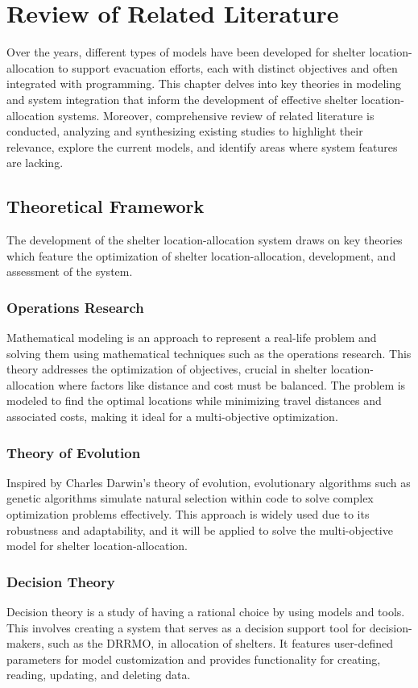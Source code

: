 \chapter{Review of Related Literature}

	Over the years, different types of models have been developed for shelter location-allocation to support evacuation efforts, each with distinct objectives and often integrated with programming. This chapter delves into key theories in modeling and system integration that inform the development of effective shelter location-allocation systems. Moreover, comprehensive review of related literature is conducted, analyzing and synthesizing existing studies to highlight their relevance, explore the current models, and identify areas where system features are lacking. 

\section{Theoretical Framework}
	The development of the shelter location-allocation system draws on key theories which feature the optimization of shelter location-allocation, development, and assessment of the system.

\subsection{Operations Research}
 	Mathematical modeling is an approach to represent a real-life problem and solving them using mathematical techniques such as the operations research. This theory addresses the optimization of objectives, crucial in shelter location-allocation where factors like distance and cost must be balanced. The problem is modeled to find the optimal locations while minimizing travel distances and associated costs, making it ideal for a multi-objective optimization.

\subsection{Theory of Evolution}
	Inspired by Charles Darwin’s theory of evolution, evolutionary algorithms such as genetic algorithms simulate natural selection within code to solve complex optimization problems effectively. This approach is widely used due to its robustness and adaptability, and it will be applied to solve the multi-objective model for shelter location-allocation.

\subsection{Decision Theory}
 	Decision theory is a study of having a rational choice by using models and tools. This involves creating a system that serves as a decision support tool for decision-makers, such as the DRRMO, in allocation of shelters. It features user-defined parameters for model customization and provides functionality for creating, reading, updating, and deleting data.

